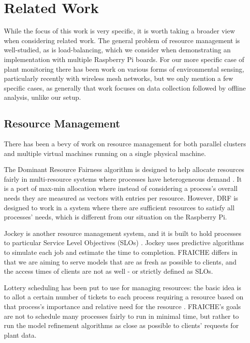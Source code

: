 \documentclass[a4paper]{acm_proc_article-sp}
\begin{document}
\section{Related Work}

While the focus of this work is very specific, it is worth taking a broader view when considering related work.  The general problem of resource management is well-studied, as is load-balancing, which we consider when demonstrating an implementation with multiple Raspberry Pi boards.  For our more specific case of plant monitoring there has been work on various forms of environmental sensing, particularly recently with wireless mesh networks, but we only mention a few specific cases, as generally that work focuses on data collection followed by offline analysis, unlike our setup.

\subsection{Resource Management}
There has been a bevy of work on resource management for both parallel clusters and multiple virtual machines running on a single physical machine.

The Dominant Resource Fairness algorithm is designed to help allocate resources fairly in multi-resource systems where processes have heterogeneous demand \cite{Ghodsi:2011vm}. It is a port of max-min allocation where instead of considering a process's overall needs they are measured as vectors with entries per resource.  However, DRF is designed to work in a system where there are sufficient resources to satisfy all processes' needs, which is different from our situation on the Raspberry Pi.

Jockey is another resource management system, and it is built to hold processes to particular Service Level Objectives (SLOs) \cite{Ferguson:2012tx}.  Jockey uses predictive algorithms to simulate each job and estimate the time to completion. FRAICHE differs in that we are aiming to serve models that are as fresh as possible to clients, and the access times of clients are not as well - or strictly defined as SLOs.

Lottery scheduling has been put to use for managing resources: the basic idea is to allot a certain number of tickets to each process requiring a resource based on that process's importance and relative need for the resource \cite{Waldspurger:1994we}. FRAICHE's goals are not to schedule many processes fairly to run in minimal time, but rather to run the model refinement algorithms as close as possible to clients' requests for plant data.
\end{document}
